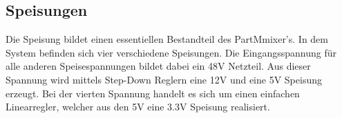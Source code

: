 \subsection{Speisungen}
\label{subsec:Speisungen}

Die Speisung bildet einen essentiellen Bestandteil des PartMmixer's. In dem System befinden sich vier verschiedene Speisungen. Die Eingangsspannung für alle anderen Speisespannungen bildet dabei ein 48V Netzteil. Aus dieser Spannung wird mittels Step-Down Reglern eine 12V und eine 5V Speisung erzeugt. Bei der vierten Spannung handelt es sich um einen einfachen Linearregler, welcher aus den 5V eine 3.3V Speisung realisiert. 